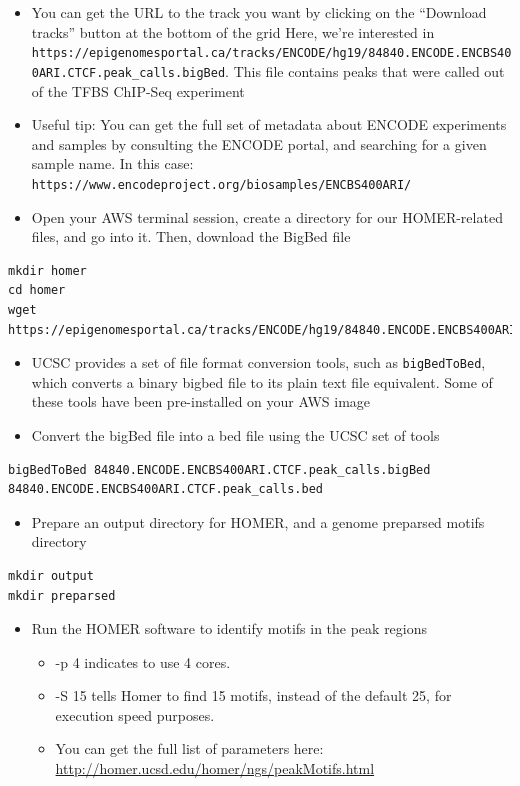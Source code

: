 \documentclass[
]{book}
\providecommand{\tightlist}{%
  \setlength{\itemsep}{0pt}\setlength{\parskip}{0pt}}
\begin{document}
\begin{itemize}
\tightlist
\item
  You can get the URL to the track you want by clicking on the ``Download tracks'' button at the bottom of the grid Here, we're interested in \texttt{https://epigenomesportal.ca/tracks/ENCODE/hg19/84840.ENCODE.ENCBS400ARI.CTCF.peak\_calls.bigBed}. This file contains peaks that were called out of the TFBS ChIP-Seq experiment
\item
  Useful tip: You can get the full set of metadata about ENCODE experiments and samples by consulting the ENCODE portal, and searching for a given sample name. In this case: \texttt{https://www.encodeproject.org/biosamples/ENCBS400ARI/}
\item
  Open your AWS terminal session, create a directory for our HOMER-related files, and go into it. Then, download the BigBed file
\end{itemize}

\begin{verbatim}
mkdir homer
cd homer
wget https://epigenomesportal.ca/tracks/ENCODE/hg19/84840.ENCODE.ENCBS400ARI.CTCF.peak_calls.bigBed
\end{verbatim}

\begin{itemize}
\tightlist
\item
  UCSC provides a set of file format conversion tools, such as \texttt{bigBedToBed}, which converts a binary bigbed file to its plain text file equivalent. Some of these tools have been pre-installed on your AWS image
\item
  Convert the bigBed file into a bed file using the UCSC set of tools
\end{itemize}

\begin{verbatim}
bigBedToBed 84840.ENCODE.ENCBS400ARI.CTCF.peak_calls.bigBed 84840.ENCODE.ENCBS400ARI.CTCF.peak_calls.bed
\end{verbatim}

\begin{itemize}
\tightlist
\item
  Prepare an output directory for HOMER, and a genome preparsed motifs directory
\end{itemize}

\begin{verbatim}
mkdir output
mkdir preparsed
\end{verbatim}

\begin{itemize}
\tightlist
\item
  Run the HOMER software to identify motifs in the peak regions

  \begin{itemize}
  \tightlist
  \item
    -p 4 indicates to use 4 cores.
  \item
    -S 15 tells Homer to find 15 motifs, instead of the default 25, for execution speed purposes.
  \item
    You can get the full list of parameters here: \url{http://homer.ucsd.edu/homer/ngs/peakMotifs.html}
  \end{itemize}
\end{itemize}
\end{document}
